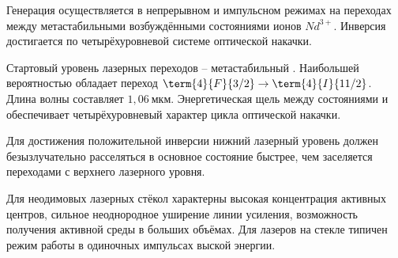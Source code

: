 Генерация осуществляется в непрерывном и импульсном режимах на переходах между
метастабильными возбуждёнными состояниями ионов \( Nd^{3+} \). Инверсия
достигается по четырёхуровневой системе оптической накачки.

Стартовый уровень лазерных переходов -- метастабильный .
Наибольшей вероятностью обладает переход \( \term{4}{F}{3/2} \rightarrow
\term{4}{I}{11/2} \). Длина волны составляет \( 1,06~\text{мкм} \).
Энергетическая щель между состояниями  и 
обеспечивает четырёхуровневый характер цикла оптической накачки.

Для достижения положительной инверсии нижний лазерный уровень должен
безызлучательно расселяться в основное состояние быстрее, чем заселяется
переходами с верхнего лазерного уровня.

Для неодимовых лазерных стёкол характерны высокая концентрация активных центров,
сильное неоднородное уширение линии усиления, возможность получения активной
среды в больших объёмах. Для лазеров на стекле типичен режим работы в одиночных
импульсах выской энергии.

